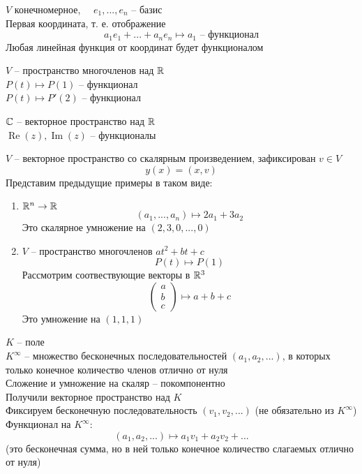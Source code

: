 \begin{exmpls}
	\item $ V $ конечномерное, $ \quad e_1, ..., e_n $ -- базис \\
	Первая координата, т. е. отображение
	$$ a_1e_1 + ... + a_ne_n \mapsto a_1 \text{ -- функционал} $$
	Любая линейная функция от координат будет функционалом
	\item $ V $ -- пространство многочленов над $ \mathbb{R} $ \\
	$ P(t) \mapsto P(1) $ -- функционал \\
	$ P(t) \mapsto P'(2) $ -- функционал
	\item $ \mathbb{C} $ -- векторное пространство над $ \mathbb{R} $ \\
	$ \operatorname{Re}(z), \operatorname{Im}(z) $ -- функционалы
	\item $ V $ -- векторное пространство со скалярным произведением, зафиксирован $ v \in V $
	$$ y(x) = (x, v) $$
	Представим предыдущие примеры в таком виде:
	\begin{enumerate}
		\item $ \mathbb{R}^n \to \mathbb{R} $
		$$ (a_1, ..., a_n) \mapsto 2a_1 + 3a_2 $$
		Это скалярное умножение на $ (2, 3, 0, ..., 0) $
		\item $ V $ -- пространство многочленов $ at^2 + bt + c $
		$$ P(t) \mapsto P(1) $$
		Рассмотрим соотвествующие векторы в $ \mathbb{R}^3 $
		$$
		\begin{pmatrix}
			a \\
			b \\
			c
		\end{pmatrix} \mapsto a + b + c $$
		Это умножение на $ (1, 1, 1) $
	\end{enumerate}
	\item $ K $ -- поле \\
	$ K^\infty $ -- множество бесконечных последовательностей $ (a_1, a_2, ...) $, в которых только конечное количество членов отлично от нуля \\
	Сложение и умножение на скаляр -- покомпонентно \\
	Получили векторное пространство над $ K $ \\
	Фиксируем бесконечную последовательность $ (v_1, v_2, ...) $ (не обязательно из $ K^\infty $) \\
	Функционал на $ K^\infty $:
	$$ (a_1, a_2, ...) \mapsto a_1v_1 + a_2v_2 + ... $$
	(это бесконечная сумма, но в ней только конечное количество слагаемых отлично от нуля)
\end{exmpls}

